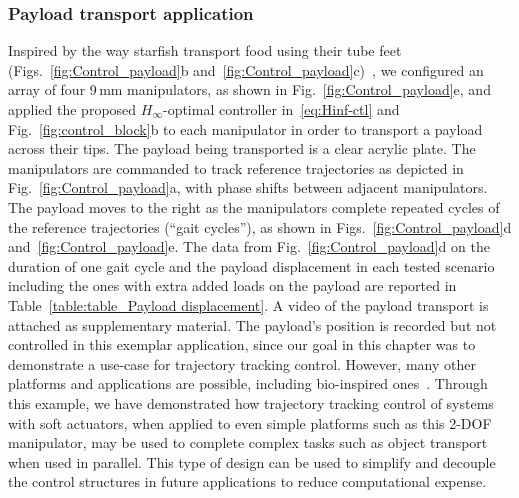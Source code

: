 \subsubsection{Payload transport application} \label{sec:payload}
Inspired by the way starfish transport food using their tube feet (Figs.~\ref{fig:Control_payload}b and~\ref{fig:Control_payload}c)~\cite{Kerkut1953,Pentreath1970}, we configured an array of four 9\,mm manipulators, as shown in Fig.~\ref{fig:Control_payload}e, and applied the proposed $H_\infty$-optimal controller in~\eqref{eq:Hinf-ctl} and Fig.~\ref{fig:control_block}b to each manipulator in order to transport a payload across their tips. The payload being transported is a clear acrylic plate. The manipulators are commanded to track reference trajectories as depicted in Fig.~\ref{fig:Control_payload}a, with phase shifts between adjacent manipulators. The payload moves to the right as the manipulators complete repeated cycles of the reference trajectories (``gait cycles''), as shown in Figs.~\ref{fig:Control_payload}d and~\ref{fig:Control_payload}e. The data from Fig.~\ref{fig:Control_payload}d on the duration of one gait cycle and the payload displacement in each tested scenario including the ones with extra added loads on the payload are reported in Table~\ref{table:table_Payload displacement}. A video of the payload transport is attached as supplementary material. The payload's position is recorded but not controlled in this exemplar application, since our goal in this chapter was to demonstrate a use-case for trajectory tracking control. However, many other platforms and applications are possible, including bio-inspired ones~\cite{Doroudchi2020}. Through this example, we have demonstrated how trajectory tracking control of systems with soft actuators, when applied to even simple platforms such as this 2-DOF manipulator, may be used to complete complex tasks such as object transport when used in parallel. This type of design can be used to simplify and decouple the control structures in future applications to reduce computational expense.

